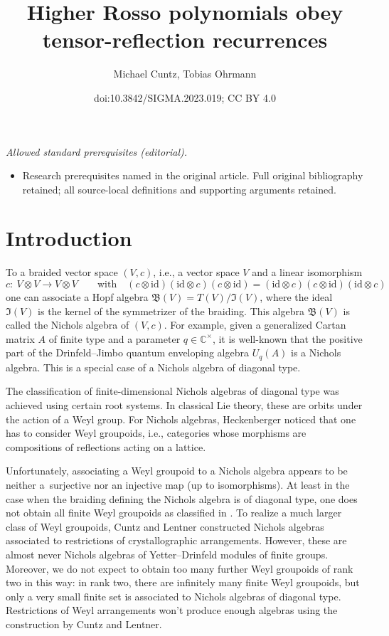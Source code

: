 \documentclass[10pt,a4paper]{amsart}
\title{Higher Rosso polynomials obey tensor-reflection recurrences}
\author{Michael Cuntz, Tobias Ohrmann}
\date{doi:10.3842/SIGMA.2023.019; CC BY 4.0}
\numberwithin{equation}{section}
\newcommand{\CC }{\mathbb{C}}
\newcommand{\id }{\mathrm{id}}
\newcommand{\BB }{\mathfrak{B}}
\newcommand{\II }{\mathfrak{I}}
\begin{document}
\maketitle
\noindent\textit{Allowed standard prerequisites (editorial).}\begin{itemize}
\item Research prerequisites named in the original article. Full original bibliography retained; all source-local definitions and supporting arguments retained.
\end{itemize}\medskip
\section{Introduction}

To a braided vector space $(V,c)$, i.e., a vector space $V$ and a linear isomorphism
\[
c \colon \ V \otimes V \rightarrow V \otimes V \qquad\text{with} \quad (c\otimes\id)(\id\otimes c)(c\otimes\id)=(\id\otimes c)(c\otimes\id)(\id\otimes c)
\]
one can associate a Hopf algebra $\BB(V) = T(V)/\II(V)$, where the ideal $\II(V)$ is the kernel of the symmetrizer of the braiding. This algebra $\BB(V)$ is called the Nichols algebra of $(V, c)$. For example, given a generalized Cartan matrix $A$ of finite type and a parameter $q\in\CC^\times$, it is well-known that the positive part of the Drinfeld--Jimbo quantum enveloping algebra
$U_q(A)$ is a Nichols algebra. This is a special case of a Nichols algebra of diagonal type.

The classification of finite-dimensional Nichols algebras of diagonal type \cite{p-H-09} was achieved using certain root systems. In classical Lie theory, these are orbits under the action of a Weyl group. For Nichols algebras, Heckenberger \cite{p-H-06} noticed that one has to consider Weyl groupoids, i.e., categories whose morphisms are compositions of reflections acting on a lattice.

Unfortunately, associating a Weyl groupoid to a Nichols algebra appears to be neither a~surjective nor an injective map (up to isomorphisms). At least in the case when the braiding defining the Nichols algebra is of diagonal type, one does not obtain all finite Weyl groupoids as classified in \cite{p-CH10}. To realize a much larger class of Weyl groupoids, Cuntz and Lentner \cite{p-CL-17} constructed Nichols algebras associated to restrictions of crystallographic arrangements. However, these are almost never Nichols algebras of Yetter--Drinfeld modules of finite groups. Moreover, we do not expect to obtain too many further Weyl groupoids of rank two in this way: in rank two, there are infinitely many finite Weyl groupoids, but only a very small finite set is associated to Nichols algebras of diagonal type. Restrictions of Weyl arrangements won't produce enough algebras using the construction by Cuntz and Lentner.
\end{document}
